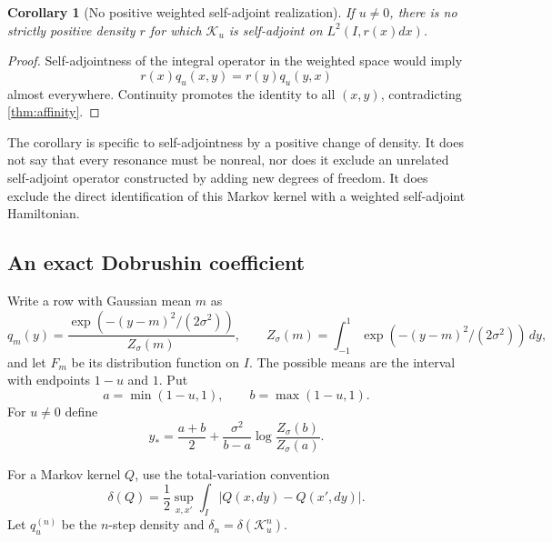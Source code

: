 \documentclass[11pt]{article}
\newtheorem{corollary}[theorem]{Corollary}
\theoremstyle{definition}
\theoremstyle{remark}
\newcommand{\cK}{\mathcal K}
\begin{document}
\begin{corollary}[No positive weighted self-adjoint realization]
\label{cor:no-selfadjoint}
If $u\ne0$, there is no strictly positive density $r$ for which $\cK_u$ is
self-adjoint on $L^2(I,r(x)dx)$.
\end{corollary}

\begin{proof}
Self-adjointness of the integral operator in the weighted space would imply
\[
 r(x)q_u(x,y)=r(y)q_u(y,x)
\]
almost everywhere.  Continuity promotes the identity to all $(x,y)$,
contradicting \cref{thm:affinity}.
\end{proof}

The corollary is specific to self-adjointness by a positive change of density.
It does not say that every resonance must be nonreal, nor does it exclude an
unrelated self-adjoint operator constructed by adding new degrees of freedom.
It does exclude the direct identification of this Markov kernel with a
weighted self-adjoint Hamiltonian.

\subsection{An exact Dobrushin coefficient}

Write a row with Gaussian mean $m$ as
\begin{equation}\label{eq:qmean}
 q_m(y)=\frac{\exp(-(y-m)^2/(2\sigma^2))}{Z_\sigma(m)},
 \qquad
 Z_\sigma(m)=\int_{-1}^1\exp(-(y-m)^2/(2\sigma^2))\,dy,
\end{equation}
and let $F_m$ be its distribution function on $I$.  The possible means are
the interval with endpoints $1-u$ and $1$.  Put
\[
 a=\min(1-u,1),\qquad b=\max(1-u,1).
\]
For $u\ne0$ define
\begin{equation}\label{eq:crossing}
 y_*=\frac{a+b}{2}+\frac{\sigma^2}{b-a}
 \log\frac{Z_\sigma(b)}{Z_\sigma(a)}.
\end{equation}

For a Markov kernel $Q$, use the total-variation convention
\begin{equation}\label{eq:dobrushin}
 \delta(Q)=\frac12\sup_{x,x'}\int_I|Q(x,dy)-Q(x',dy)|.
\end{equation}
Let $q_u^{(n)}$ be the $n$-step density and $\delta_n=\delta(\cK_u^n)$.
\end{document}
